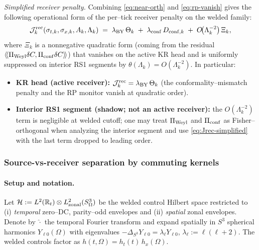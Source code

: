 \documentclass[10pt]{article}
\theoremstyle{definition}
\theoremstyle{plain}
\begin{document}
\medskip
\noindent
\emph{Simplified receiver penalty.} Combining \eqref{eq:near-orth} and \eqref{eq:rp-vanish} gives the
following operational form of the per–tick receiver penalty on the welded family:
\begin{equation}
\label{eq:Jrec-simplified}
\mathcal J^{\rm rec}_k(\sigma_{t,k},\sigma_{x,k},A_k,\Lambda_k)
\;=\;\lambda_{\rm BY}\,\Theta_k\;+\;\lambda_{\rm conf}\,D_{{\rm conf},k}
\;+\;O\!\big(\Lambda_k^{-2}\big)\,\Xi_k,
\end{equation}
where $\Xi_k$ is a nonnegative quadratic form (coming from the residual
$\langle\!\langle \Pi_{\rm Weyl}\delta C,\Pi_{\rm conf}\delta C\rangle\!\rangle$) that vanishes on the
active KR head and is uniformly suppressed on interior RS1 segments by
$\theta(\Lambda_k)=O(\Lambda_k^{-2})$. In particular:
\begin{itemize}
\item \textbf{KR head (active receiver):} $\mathcal J^{\rm rec}_k=\lambda_{\rm BY}\,\Theta_k$ (the conformality–mismatch penalty
and the RP monitor vanish at quadratic order).
\item \textbf{Interior RS1 segment (shadow; not an active receiver):} the $O(\Lambda_k^{-2})$ term is negligible
at welded cutoff; one may treat $\Pi_{\rm Weyl}$ and $\Pi_{\rm conf}$ as Fisher–orthogonal when analyzing the
interior segment and use \eqref{eq:Jrec-simplified} with the last term dropped to leading order.
\end{itemize}



\subsubsection*{Source-vs-receiver separation by commuting kernels}
\label{subsubsec:commute-shapes}

\paragraph{Setup and notation.}\label{par:uom-main-054}
Let $\mathcal H:=L^2(\mathbb R_t)\otimes L^2_{\rm zonal}(S^3_\Omega)$ be the welded control
Hilbert space restricted to (i) \emph{temporal} zero–DC, parity–odd envelopes and
(ii) \emph{spatial} zonal envelopes. Denote by $\widehat{\cdot}$ the temporal Fourier transform
and expand spatially in $S^3$ spherical harmonics $Y_{\ell 0}(\Omega)$ with eigenvalues
$-\Delta_{S^3}Y_{\ell 0}=\lambda_\ell Y_{\ell 0}$, $\lambda_\ell:=\ell(\ell+2)$.
The welded controls factor as $h(t,\Omega)=h_t(t)\,h_x(\Omega)$.
\end{document}
